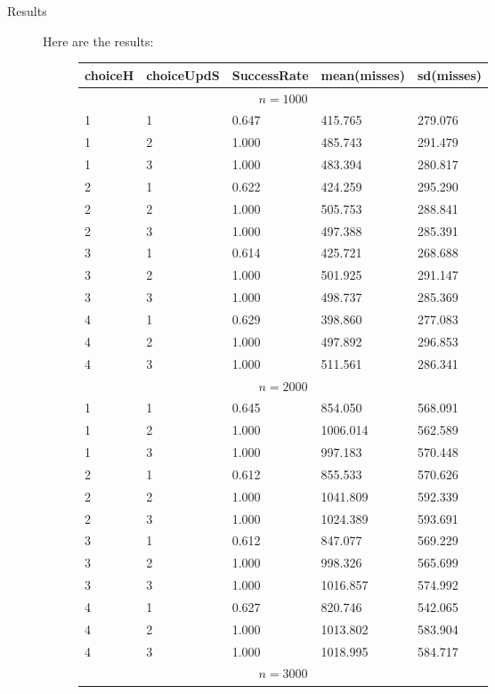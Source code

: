 \documentclass[11pt,a4paper,draft]{article}
\begin{document}
\begin{description}
	\item[Results] Here are the results:
	\begin{figure}[!h]
		\centering
		\begin{tabular}{lllll}
			\hline \hline 
			choiceH & choiceUpdS & SuccessRate & mean(misses) & sd(misses) \\
			\hline \hline 
			\multicolumn{5}{c}{$n = 1000$} \\ 
			\hline 
			1 & 1 &  0.647 & 415.765 & 279.076 \\
			1 & 2 &  1.000 & 485.743 & 291.479 \\
			1 & 3 &  1.000 & 483.394 & 280.817 \\
			\hline 
			2 & 1 &  0.622 & 424.259 & 295.290 \\
			2 & 2 &  1.000 & 505.753 & 288.841 \\
			2 & 3 &  1.000 & 497.388 & 285.391 \\
			\hline 
			3 & 1 &  0.614 & 425.721 & 268.688 \\
			3 & 2 &  1.000 & 501.925 & 291.147 \\
			3 & 3 &  1.000 & 498.737 & 285.369 \\
			\hline 
			4 & 1 &  0.629 & 398.860 & 277.083 \\
			4 & 2 &  1.000 & 497.892 & 296.853 \\
			4 & 3 &  1.000 & 511.561 & 286.341 \\
			\hline 
			\hline 
			\multicolumn{5}{c}{$n = 2000$} \\ 
			\hline 
			1 & 1 &  0.645 & 854.050 & 568.091 \\
			1 & 2 &  1.000 & 1006.014 & 562.589 \\
			1 & 3 &  1.000 & 997.183 & 570.448 \\
			\hline 
			2 & 1 &  0.612 & 855.533 & 570.626 \\
			2 & 2 &  1.000 & 1041.809 & 592.339 \\
			2 & 3 &  1.000 & 1024.389 & 593.691 \\
			\hline 
			3 & 1 &  0.612 & 847.077 & 569.229 \\
			3 & 2 &  1.000 & 998.326 & 565.699 \\
			3 & 3 &  1.000 & 1016.857 & 574.992 \\
			\hline 
			4 & 1 &  0.627 & 820.746 & 542.065 \\
			4 & 2 &  1.000 & 1013.802 & 583.904 \\
			4 & 3 &  1.000 & 1018.995 & 584.717 \\
			\hline 
			\hline 
			\multicolumn{5}{c}{$n = 3000$} \\ 

\end{tabular}
\end{figure}
\end{description}
\end{document}
